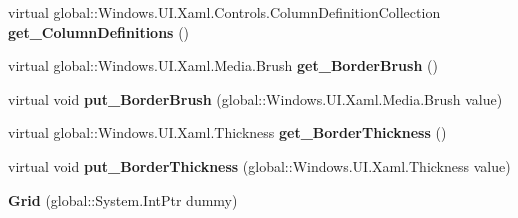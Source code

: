 \begin{DoxyCompactItemize}
virtual global\+::\+Windows.\+U\+I.\+Xaml.\+Controls.\+Column\+Definition\+Collection {\bfseries get\+\_\+\+Column\+Definitions} ()
\item 
\mbox{\label{class_windows_1_1_u_i_1_1_xaml_1_1_controls_1_1_grid_a56ab844ebf9b8faa820b652c2c5e592b}} 
virtual global\+::\+Windows.\+U\+I.\+Xaml.\+Media.\+Brush {\bfseries get\+\_\+\+Border\+Brush} ()
\item 
\mbox{\label{class_windows_1_1_u_i_1_1_xaml_1_1_controls_1_1_grid_a27800ef05d364a3b9417b09943ae92bf}} 
virtual void {\bfseries put\+\_\+\+Border\+Brush} (global\+::\+Windows.\+U\+I.\+Xaml.\+Media.\+Brush value)
\item 
\mbox{\label{class_windows_1_1_u_i_1_1_xaml_1_1_controls_1_1_grid_ae403f1f4e529c68e04423bf21fc36cc7}} 
virtual global\+::\+Windows.\+U\+I.\+Xaml.\+Thickness {\bfseries get\+\_\+\+Border\+Thickness} ()
\item 
\mbox{\label{class_windows_1_1_u_i_1_1_xaml_1_1_controls_1_1_grid_a7ec7f388cb8d2882e412b29d60fb8e78}} 
virtual void {\bfseries put\+\_\+\+Border\+Thickness} (global\+::\+Windows.\+U\+I.\+Xaml.\+Thickness value)
\item 
\mbox{\label{class_windows_1_1_u_i_1_1_xaml_1_1_controls_1_1_grid_a8a9435e4defeeee271d7eef51280e839}} 
{\bfseries Grid} (global\+::\+System.\+Int\+Ptr dummy)
\end{DoxyCompactItemize}
